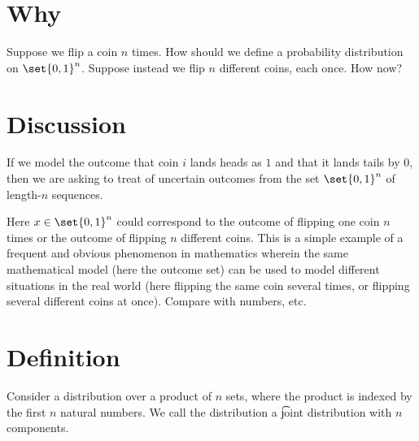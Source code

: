 

\section*{Why}

Suppose we flip a coin $n$ times.
How should we define a probability distribution on $\set{0, 1}^n$.
Suppose instead we flip $n$ different coins, each once.
How now?

\section*{Discussion}

If we model the outcome that coin $i$ lands heads as $1$ and that it lands tails by $0$, then we are asking to treat of uncertain outcomes from the set $\set{0, 1}^n$ of length-$n$ sequences.

Here $x \in \set{0, 1}^n$ could correspond to the outcome of flipping one coin $n$ times or the outcome of flipping $n$ different coins.
This is a simple example of a frequent and obvious phenomenon in mathematics wherein the same mathematical model (here the outcome set) can be used to model different situations in the real world (here flipping the same coin several times, or flipping several different coins at once).
Compare with numbers, etc.

\section*{Definition}

Consider a distribution over a product of $n$ sets, where the product is indexed by the first $n$ natural numbers.
We call the distribution a \t{joint distribution} with $n$ components.

\blankpage